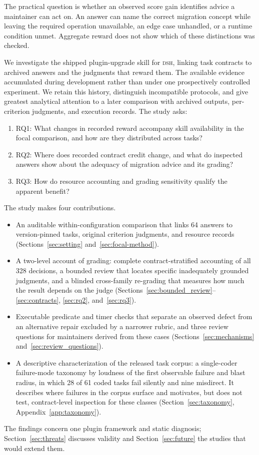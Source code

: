 \documentclass[11pt]{article}
\newcommand{\framework}{\textsc{dsh}}
\begin{document}
The practical question is whether an observed score gain identifies advice a maintainer can act on. An answer can name the correct migration concept while leaving the required operation unavailable, an edge case unhandled, or a runtime condition unmet. Aggregate reward does not show which of these distinctions was checked.

We investigate the shipped plugin-upgrade skill for \framework{}, linking task contracts to archived answers and the judgments that reward them. The available evidence accumulated during development rather than under one prospectively controlled experiment. We retain this history, distinguish incompatible protocols, and give greatest analytical attention to a later comparison with archived outputs, per-criterion judgments, and execution records. The study asks:
\begin{enumerate}
\item RQ1: What changes in recorded reward accompany skill availability in the focal comparison, and how are they distributed across tasks?
\item RQ2: Where does recorded contract credit change, and what do inspected answers show about the adequacy of migration advice and its grading?
\item RQ3: How do resource accounting and grading sensitivity qualify the apparent benefit?
\end{enumerate}

The study makes four contributions.
\begin{itemize}
\item An auditable within-configuration comparison that links 64 answers to version-pinned tasks, original criterion judgments, and resource records (Sections~\ref{sec:setting} and~\ref{sec:focal-method}).
\item A two-level account of grading: complete contract-stratified accounting of all 328 decisions, a bounded review that locates specific inadequately grounded judgments, and a blinded cross-family re-grading that measures how much the result depends on the judge (Sections~\ref{sec:bounded_review}--\ref{sec:contracts}, \ref{sec:rq2}, and~\ref{sec:rq3}).
\item Executable predicate and timer checks that separate an observed defect from an alternative repair excluded by a narrower rubric, and three review questions for maintainers derived from these cases (Sections~\ref{sec:mechanisms} and~\ref{sec:review_questions}).
\item A descriptive characterization of the released task corpus: a single-coder failure-mode taxonomy by loudness of the first observable failure and blast radius, in which 28 of 61 coded tasks fail silently and nine misdirect. It describes where failures in the corpus surface and motivates, but does not test, contract-level inspection for these classes (Section~\ref{sec:taxonomy}, Appendix~\ref{app:taxonomy}).
\end{itemize}
The findings concern one plugin framework and static diagnosis; Section~\ref{sec:threats} discusses validity and Section~\ref{sec:future} the studies that would extend them.
\end{document}
